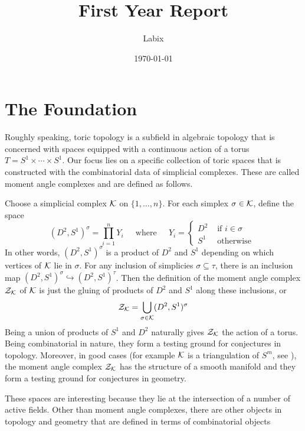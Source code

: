 \documentclass[a4paper]{article}
\title{First Year Report}
\author{Labix}
\date{\today}
\begin{document}
\maketitle

\pagebreak
\section*{The Foundation}
Roughly speaking, toric topology is a subfield in algebraic topology that is concerned with spaces equipped with a continuous action of a torus $T=S^1\times\cdots\times S^1$. Our focus lies on a specific collection of toric spaces that is constructed with the combinatorial data of simplicial complexes. These are called moment angle complexes and are defined as follows. 

Choose a simplicial complex $\mathcal{K}$ on $\{1,\dots,n\}$. For each simplex $\sigma\in\mathcal{K}$, define the space $$(D^2,S^1)^\sigma=\prod_{i=1}^nY_i\;\;\;\;\text{ where }\;\;\;\;Y_i=\begin{cases}
D^2 & \text{ if }i\in\sigma\\
S^1 & \text{ otherwise }
\end{cases}$$ In other words, $(D^2,S^1)^\sigma$ is a product of $D^2$ and $S^1$ depending on which vertices of $\mathcal{K}$ lie in $\sigma$. For any inclusion of simplicies $\sigma\subseteq\tau$, there is an inclusion map $(D^2,S^1)^\sigma\hookrightarrow(D^2,S^1)^\tau$. Then the definition of the moment angle complex $\mathcal{Z}_{\mathcal{K}}$ of $\mathcal{K}$ is just the gluing of products of $D^2$ and $S^1$ along these inclusions, or $$\mathcal{Z}_{\mathcal{K}}=\bigcup_{\sigma\in\mathcal{K}}(D^2,S^1)^\sigma$$ Being a union of products of $S^1$ and $D^2$ naturally gives $\mathcal{Z}_{\mathcal{K}}$ the action of a torus. Being combinatorial in nature, they form a testing ground for conjectures in topology. Moreover, in good cases (for example $\mathcal{K}$ is a triangulation of $S^m$, see \cite{ToricTopology}), the moment angle complex $\mathcal{Z}_{\mathcal{K}}$ has the structure of a smooth manifold and they form a testing ground for conjectures in geometry. 

These spaces are interesting because they lie at the intersection of a number of active fields. Other than moment angle complexes, there are other objects in topology and geometry that are defined in terms of combinatorial objects

 \\
\end{document}
